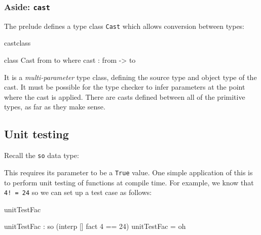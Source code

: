 
\subsubsection*{Aside: \texttt{cast}}

The prelude defines a type class \texttt{Cast} which allows conversion between
types:

\begin{SaveVerbatim}{castclass}

class Cast from to where
    cast : from -> to

\end{SaveVerbatim}

\noindent
It is a \emph{multi-parameter} type class, defining the source type and object
type of the cast. It must be possible for the type checker to infer 
parameters at the point where the cast is applied.
There are casts defined between all of the primitive types, as far as
they make sense.

\subsection{Unit testing}

Recall the \texttt{so} data type:


\noindent
This requires its parameter to be a \texttt{True} value. One simple application of this
is to perform unit testing of functions at compile time. For example, we know that 
\texttt{4! = 24} so we can set up a test case as follows:

\begin{SaveVerbatim}{unitTestFac}

unitTestFac : so (interp [] fact 4 == 24)
unitTestFac = oh

\end{SaveVerbatim}

